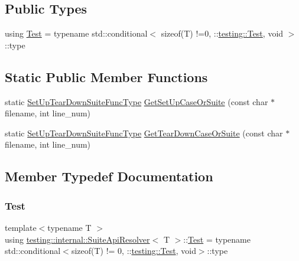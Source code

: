 \subsection*{Public Types}
\begin{DoxyCompactItemize}
\item 
using \hyperlink{structtesting_1_1internal_1_1SuiteApiResolver_a343c36f492a946d302b1cfc930266768}{Test} = typename std\+::conditional$<$ sizeof(T) !=0, \+::\hyperlink{classtesting_1_1Test}{testing\+::\+Test}, void $>$\+::type
\end{DoxyCompactItemize}
\subsection*{Static Public Member Functions}
\begin{DoxyCompactItemize}
\item 
static \hyperlink{namespacetesting_1_1internal_a04786aa10f8b0bf38a5ead94d00475f4}{Set\+Up\+Tear\+Down\+Suite\+Func\+Type} \hyperlink{structtesting_1_1internal_1_1SuiteApiResolver_abae647b1fed9422fc596fd385de6dd5b}{Get\+Set\+Up\+Case\+Or\+Suite} (const char $\ast$filename, int line\+\_\+num)
\item 
static \hyperlink{namespacetesting_1_1internal_a04786aa10f8b0bf38a5ead94d00475f4}{Set\+Up\+Tear\+Down\+Suite\+Func\+Type} \hyperlink{structtesting_1_1internal_1_1SuiteApiResolver_a60e647dc7974c2e834812c491cbbca25}{Get\+Tear\+Down\+Case\+Or\+Suite} (const char $\ast$filename, int line\+\_\+num)
\end{DoxyCompactItemize}


\subsection{Member Typedef Documentation}
\mbox{\label{structtesting_1_1internal_1_1SuiteApiResolver_a343c36f492a946d302b1cfc930266768}} 
\subsubsection{\texorpdfstring{Test}{Test}}
{\footnotesize\ttfamily template$<$typename T $>$ \\
using \hyperlink{structtesting_1_1internal_1_1SuiteApiResolver}{testing\+::internal\+::\+Suite\+Api\+Resolver}$<$ T $>$\+::\hyperlink{structtesting_1_1internal_1_1SuiteApiResolver_a343c36f492a946d302b1cfc930266768}{Test} =  typename std\+::conditional$<$sizeof(T) != 0, \+::\hyperlink{classtesting_1_1Test}{testing\+::\+Test}, void$>$\+::type}



